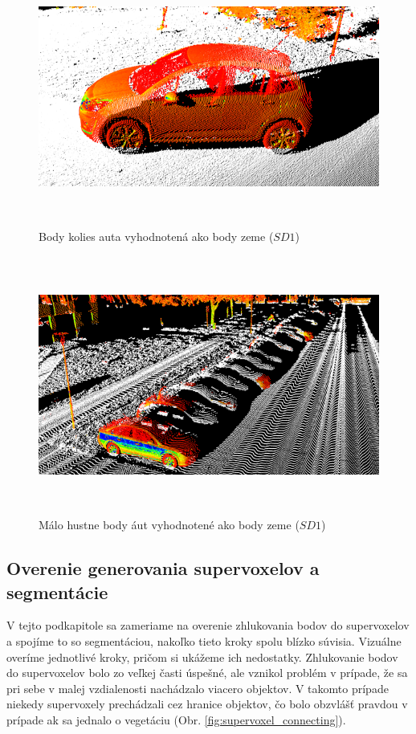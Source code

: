 \vfill
\begin{figure}[!htbp]
  \centering
  \includegraphics[width=16cm, height=8.5cm]{img/seprartion_wheels.png}
  \caption{Body kolies auta vyhodnotená ako body zeme ($SD1$)} 
  \label{fig:seprartion_wheels}
\end{figure}

\begin{figure}[!htbp]
  \centering
  \includegraphics[width=16cm, height=8.5cm]{img/seprartion_density.png}
  \caption{Málo hustne body áut vyhodnotené ako body zeme ($SD1$)} 
  \label{fig:seprartion_density}
\end{figure}

\subsection{Overenie generovania supervoxelov a segmentácie}
\noindent V tejto podkapitole sa zameriame na overenie zhlukovania bodov do supervoxelov a spojíme to so segmentáciou, nakoľko tieto kroky spolu blízko súvisia. Vizuálne overíme jednotlivé kroky, pričom si ukážeme ich nedostatky.
\newline\indent Zhlukovanie bodov do supervoxelov bolo zo veľkej časti úspešné, ale vznikol problém v prípade, že sa pri sebe v malej vzdialenosti nachádzalo viacero objektov. V takomto prípade niekedy supervoxely prechádzali cez hranice objektov, čo bolo obzvlášť pravdou v prípade ak sa jednalo o vegetáciu (Obr. \ref{fig:supervoxel_connecting}).

